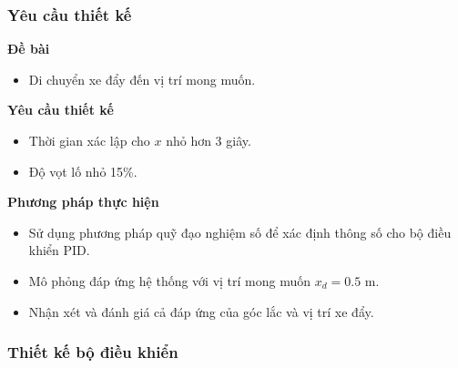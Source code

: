\documentclass[12pt,a4paper]{article}
\begin{document}
\subsubsection{Yêu cầu thiết kế}
\begin{minipage}[t]{0.3\linewidth}
    \textbf{Đề bài}
\end{minipage}\begin{minipage}[t]{0.6\linewidth}
    \begin{itemize}
        \item  Di chuyển xe đẩy đến vị trí mong muốn.
    \end{itemize}
\end{minipage}

\vspace{\baselineskip}

\begin{minipage}[t]{0.3\linewidth}
    \textbf{Yêu cầu thiết kế}
\end{minipage}\begin{minipage}[t]{0.6\linewidth}
    \begin{itemize}[noitemsep,topsep=0pt]
        \item Thời gian xác lập cho $x$ nhỏ hơn 3 giây.
        \item Độ vọt lố nhỏ 15\%.
    \end{itemize}
\end{minipage}

\vspace{\baselineskip}

\begin{minipage}[t]{0.3\linewidth}
    \textbf{Phương pháp thực hiện}
\end{minipage}\begin{minipage}[t]{0.6\linewidth}
    \begin{itemize}[noitemsep,topsep=0pt]
        \item Sử dụng phương pháp quỹ đạo nghiệm số để xác định thông số cho bộ điều khiển PID.
        \item Mô phỏng đáp ứng hệ thống với vị trí mong muốn $x_d = 0.5$ m.
        \item Nhận xét và đánh giá cả đáp ứng của góc lắc và vị trí xe đẩy.
    \end{itemize}
\end{minipage}

\subsubsection{Thiết kế bộ điều khiển}
\end{document}
